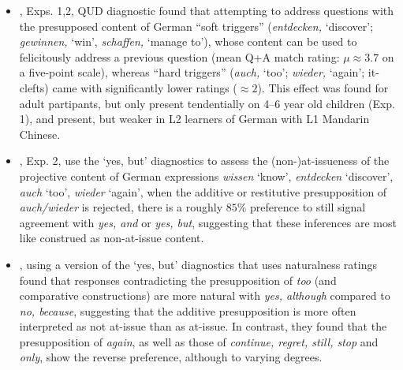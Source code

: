 \documentclass[times,linguex,xcolor]{glossa}
\begin{document}
    \begin{itemize}
      \item \citealt{chen_presuppositions_2024}, Exps. 1,2, QUD diagnostic found that attempting to address questions with the presupposed content of German \enquote{soft triggers} (\emph{entdecken,} ‘discover’; \emph{gewinnen,} ‘win’, \emph{schaffen,} ‘manage to’), whose content can be used to felicitously address a previous question (mean Q+A match rating: $\mu \approx 3.7$ on a five-point scale), whereas \enquote{hard triggers} (\emph{auch,} ‘too’; \emph{wieder,} ‘again’; it-clefts) came with significantly lower ratings ($\approx 2$). This effect was found for adult partipants, but only present tendentially on 4--6 year old children (Exp. 1), and present, but weaker in L2 learners of German with L1 Mandarin Chinese.

      

      \item \citealt{xue_correlation_2011}, Exp. 2, use the `yes, but' diagnostics to assess the (non-)at-issueness of the projective content of German expressions \emph{wissen} `know',  \emph{entdecken} `discover',  \emph{auch} `too',  \emph{wieder} `again', when the additive or restitutive presupposition of \emph{auch/wieder} is rejected, there is a roughly $85\%$ preference to still signal agreement with \emph{yes, and} or \emph{yes, but}, suggesting that these inferences are most like construed as non-at-issue content.

      \item \citealt{cummins_backgrounding_2013}, using a version of the `yes, but' diagnostics that uses naturalness ratings found that responses contradicting the presupposition of \emph{too} (and comparative constructions) are more natural with \emph{yes, although} compared to \emph{no, because}, suggesting that the additive presupposition is more often interpreted as not at-issue than as at-issue. In contrast, they found that the presupposition of \emph{again}, as well as those of \emph{continue, regret, still, stop} and \emph{only}, show the reverse preference, although to varying degrees.


    \end{itemize}
\end{document}
